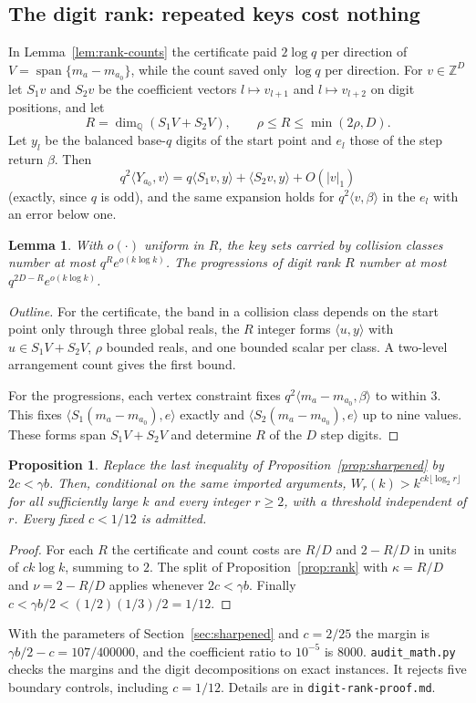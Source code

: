 \documentclass[11pt]{article}
\newtheorem{lemma}{Lemma}
\newtheorem{proposition}{Proposition}
\begin{document}
\subsection{The digit rank: repeated keys cost nothing}\label{sec:digit-rank}
In Lemma~\ref{lem:rank-counts} the certificate paid $2\log q$ per
direction of $V=\operatorname{span}\{m_a-m_{a_0}\}$, while the count saved
only $\log q$ per direction. For $v\in\mathbb Z^D$ let $S_1v$ and $S_2v$ be the
coefficient vectors $l\mapsto v_{l+1}$ and $l\mapsto v_{l+2}$ on digit
positions, and let
\[
 R=\dim_{\mathbb Q}(S_1V+S_2V),\qquad \rho\le R\le\min(2\rho,D).
\]
Let $y_l$ be the balanced base-$q$ digits of the start point and $e_l$
those of the step return $\beta$. Then
\[
 q^2\langle Y_{a_0},v\rangle=q\langle S_1v,y\rangle+\langle S_2v,y\rangle
 +O(|v|_1)
\]
(exactly, since $q$ is odd), and the same expansion holds for
$q^2\langle v,\beta\rangle$ in the $e_l$ with an error below one.
\begin{lemma}\label{lem:digit-rank}
With $o(\cdot)$ uniform in $R$, the key sets carried by collision
classes number at most $q^{R}e^{o(k\log k)}$. The progressions of digit
rank $R$ number at most $q^{2D-R}e^{o(k\log k)}$.
\end{lemma}
\begin{proof}[Outline]
For the certificate, the band in a collision class depends on the start
point only through three global reals, the $R$ integer forms
$\langle u,y\rangle$ with $u\in S_1V+S_2V$, $\rho$ bounded reals, and one
bounded scalar per class. A two-level arrangement count gives the first
bound.

For the progressions, each vertex constraint fixes $q^2\langle m_a-m_{a_0},\beta\rangle$
to within $3$. This fixes $\langle S_1(m_a-m_{a_0}),e\rangle$ exactly and
$\langle S_2(m_a-m_{a_0}),e\rangle$ up to nine values. These forms span
$S_1V+S_2V$ and determine $R$ of the $D$ step digits.
\end{proof}
\begin{proposition}\label{prop:digit-rank}
Replace the last inequality of Proposition~\ref{prop:sharpened} by
$2c<\gamma b$. Then, conditional on the same imported arguments,
$W_r(k)>k^{ck\lfloor\log_2r\rfloor}$ for all sufficiently large $k$ and every
integer $r\ge2$, with a threshold independent of $r$. Every fixed $c<1/12$
is admitted.
\end{proposition}
\begin{proof}
For each $R$ the certificate and count costs are $R/D$ and $2-R/D$ in units
of $ck\log k$, summing to $2$. The split of Proposition~\ref{prop:rank}
with $\kappa=R/D$ and $\nu=2-R/D$ applies whenever $2c<\gamma b$. Finally
$c<\gamma b/2<(1/2)(1/3)/2=1/12$.
\end{proof}
With the parameters of Section~\ref{sec:sharpened} and $c=2/25$ the margin
is $\gamma b/2-c=107/400000$, and the coefficient ratio to $10^{-5}$ is
$8000$. \texttt{audit\_math.py} checks the margins and the digit
decompositions on exact instances. It rejects five boundary controls,
including $c=1/12$. Details are in
\texttt{digit-rank-proof.md}.
\end{document}
